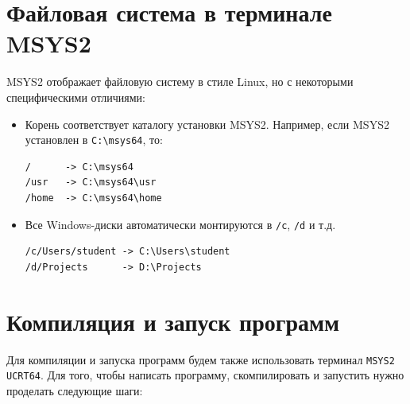 \documentclass{article}
\begin{document}
\section*{Файловая система в терминале MSYS2}
MSYS2 отображает файловую систему в стиле Linux, но с некоторыми специфическими отличиями:
\begin{itemize}
\item Корень соответствует каталогу установки MSYS2. Например, если MSYS2 установлен в \texttt{C:\textbackslash msys64}, то:
\begin{verbatim}
/      -> C:\msys64
/usr   -> C:\msys64\usr
/home  -> C:\msys64\home
\end{verbatim}
\item Все Windows-диски автоматически монтируются в \texttt{/c}, \texttt{/d} и т.д.
\begin{verbatim}
/c/Users/student -> C:\Users\student
/d/Projects      -> D:\Projects
\end{verbatim}

\end{itemize}

\section*{Компиляция и запуск программ}
Для компиляции и запуска программ будем также использовать терминал \texttt{MSYS2 UCRT64}. Для того, чтобы написать программу, скомпилировать и запустить нужно проделать следующие шаги:
\end{document}
